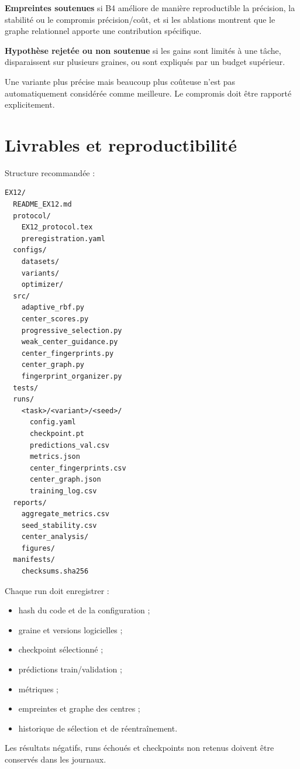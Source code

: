 \documentclass[11pt,a4paper]{article}
\begin{document}
\textbf{Empreintes soutenues} si B4 améliore de manière reproductible
la précision, la stabilité ou le compromis précision/coût, et si les
ablations montrent que le graphe relationnel apporte une contribution
spécifique.

\textbf{Hypothèse rejetée ou non soutenue} si les gains sont limités à
une tâche, disparaissent sur plusieurs graines, ou sont expliqués par
un budget supérieur.

Une variante plus précise mais beaucoup plus coûteuse n'est pas
automatiquement considérée comme meilleure. Le compromis doit être
rapporté explicitement.

\section{Livrables et reproductibilité}

Structure recommandée :
\begin{verbatim}
EX12/
  README_EX12.md
  protocol/
    EX12_protocol.tex
    preregistration.yaml
  configs/
    datasets/
    variants/
    optimizer/
  src/
    adaptive_rbf.py
    center_scores.py
    progressive_selection.py
    weak_center_guidance.py
    center_fingerprints.py
    center_graph.py
    fingerprint_organizer.py
  tests/
  runs/
    <task>/<variant>/<seed>/
      config.yaml
      checkpoint.pt
      predictions_val.csv
      metrics.json
      center_fingerprints.csv
      center_graph.json
      training_log.csv
  reports/
    aggregate_metrics.csv
    seed_stability.csv
    center_analysis/
    figures/
  manifests/
    checksums.sha256
\end{verbatim}

Chaque run doit enregistrer :
\begin{itemize}
  \item hash du code et de la configuration ;
  \item graine et versions logicielles ;
  \item checkpoint sélectionné ;
  \item prédictions train/validation ;
  \item métriques ;
  \item empreintes et graphe des centres ;
  \item historique de sélection et de réentraînement.
\end{itemize}

Les résultats négatifs, runs échoués et checkpoints non retenus
doivent être conservés dans les journaux.
\end{document}
